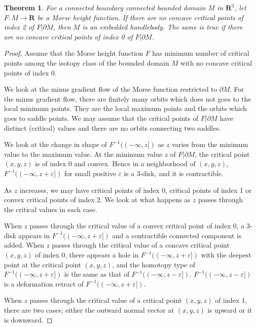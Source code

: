 \documentclass{amsart}
\newtheorem{theorem}{Theorem}[section]
\numberwithin{equation}{section}
\newcommand{\RR}{{\boldsymbol{R}}}
\newcommand{\lra}{\longrightarrow}
\newcommand{\bd}{\partial}
\begin{document}
\begin{theorem}\label{th:without_concave_critial_points}
For a connected boundary connected bounded domain $M$ in $\RR^3$, let $F:M\lra \RR$ be a Morse height function. If there are no concave critical points of index 2 of $F|\bd M$, then $M$ is an embedded handlebody. The same is true if there are no concave critical points of index 0 of $F|\bd M$.
\end{theorem}
\begin{proof}
Assume that the Morse height function $F$ has minimum number of critical points among the isotopy class of the bounded domain $M$ with no concave critical points of index 0.

We look at the minus gradient flow of the Morse function restricted to $\bd M$.
For the minus gradient flow, there are finitely many orbits which does not goes to the local minimum points. They are the local maximum points and the orbits which goes to saddle points. We may assume that the critical points of $F|\bd M$ have distinct (critical) values and there are no orbits connecting two saddles. 

We look at the change in shape of $F^{-1}((-\infty,z])$ as $z$ varies from the minimum value to the maximum value.
At the minimum value $z$ of $F|\bd M$, the critical point $(x,y,z)$ is of index 0 and convex. Hence in a neighborhood of $(x,y,z)$, $F^{-1}((-\infty,z+\varepsilon])$ for small positive $\varepsilon$ is a 3-disk, and it is contractible. 

As $z$ increases, we may have critical points of index 0, critical points of index 1 or convex critical points of index 2. We look at what happens as $z$ passes through the critical values in each case.

When $z$ passes through the critical value of a convex critical point of index 0, a 3-disk appears in $F^{-1}((-\infty,z+\varepsilon])$ 
and a contractible connected component is added. 
When $z$ passes through the critical value of a concave critical point $(x,y,z)$ of index 0, there appears a hole in $F^{-1}((-\infty,z+\varepsilon])$ with the deepest point at the critical point $(x,y,z)$, and the homotopy type of $F^{-1}((-\infty,z+\varepsilon])$ is the same as that of $F^{-1}((-\infty,z-\varepsilon])$.  $F^{-1}((-\infty,z-\varepsilon])$ is a deformation retract of $F^{-1}((-\infty,z+\varepsilon])$.

When $z$ passes through the critical value of a critical point $(x,y,z)$ of index 1, there are two cases; either the outward normal vector at $(x,y,z)$ is upward or it is downward. 


\end{proof}
\end{document}

